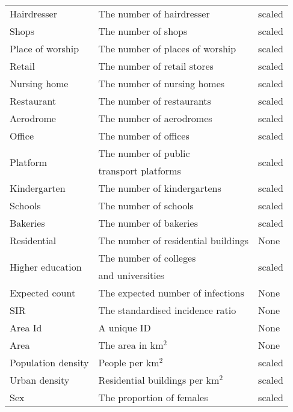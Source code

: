 \begin{table}[H]
\begin{tabular}{l l l}
Hairdresser & The number of hairdresser & scaled \\
Shops & The number of shops & scaled \\
Place of worship & The number of places of worship & scaled \\
Retail & The number of retail stores & scaled \\
Nursing home & The number of nursing homes & scaled \\
Restaurant & The number of restaurants & scaled \\
Aerodrome & The number of aerodromes & scaled \\
Office & The number of offices & scaled \\
\multirow{2}{*}{Platform} & The number of public & \multirow{2}{*}{scaled} \\
& transport platforms \\
Kindergarten & The number of kindergartens & scaled \\
Schools & The number of schools & scaled \\
Bakeries & The number of bakeries & scaled \\
Residential & The number of residential buildings & None \\
\multirow{2}{*}{Higher education} & The number of colleges & \multirow{2}{*}{scaled} \\
& and universities \\
Expected count & The expected number of infections & None \\
SIR & The standardised incidence ratio & None \\
Area Id & A unique ID & None \\
Area & The area in km$^2$ & None \\
Population density & People per km$^2$ & scaled  \\
\multirow{1}{*}{Urban density} & Residential buildings per km$^2$  & scaled\\
Sex & The proportion of females & scaled \\
\bottomrule
\end{tabular}
\end{table}